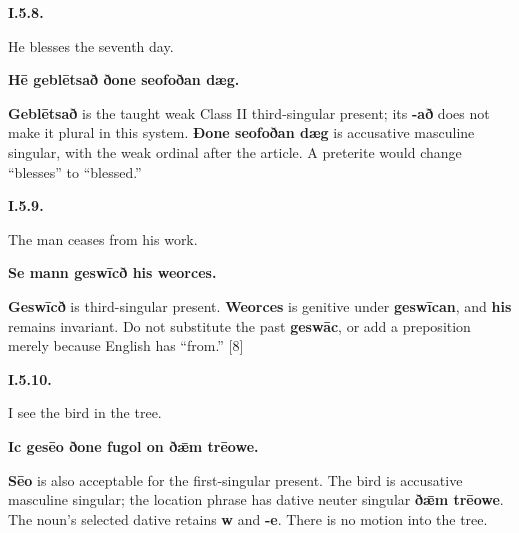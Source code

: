 \par\begin{minipage}{\linewidth}\raggedright
\textbf{I.5.8.}

He blesses the seventh day.

\textbf{Hē geblētsað ðone seofoðan dæg.}

\textbf{Geblētsað} is the taught weak Class II third-singular present; its \textbf{-að} does not make it plural in this system. \textbf{Ðone seofoðan dæg} is accusative masculine singular, with the weak ordinal after the article. A preterite would change “blesses” to “blessed.”

\end{minipage}\par\addvspace{4pt}

\par\begin{minipage}{\linewidth}\raggedright
\textbf{I.5.9.}

The man ceases from his work.

\textbf{Se mann geswīcð his weorces.}

\textbf{Geswīcð} is third-singular present. \textbf{Weorces} is genitive under \textbf{geswīcan}, and \textbf{his} remains invariant. Do not substitute the past \textbf{geswāc}, or add a preposition merely because English has “from.” [8]

\end{minipage}\par\addvspace{4pt}

\par\begin{minipage}{\linewidth}\raggedright
\textbf{I.5.10.}

I see the bird in the tree.

\textbf{Ic gesēo ðone fugol on ðǣm trēowe.}

\textbf{Sēo} is also acceptable for the first-singular present. The bird is accusative masculine singular; the location phrase has dative neuter singular \textbf{ðǣm trēowe}. The noun's selected dative retains \textbf{w} and \textbf{-e}. There is no motion into the tree.

\end{minipage}\par\addvspace{4pt}

